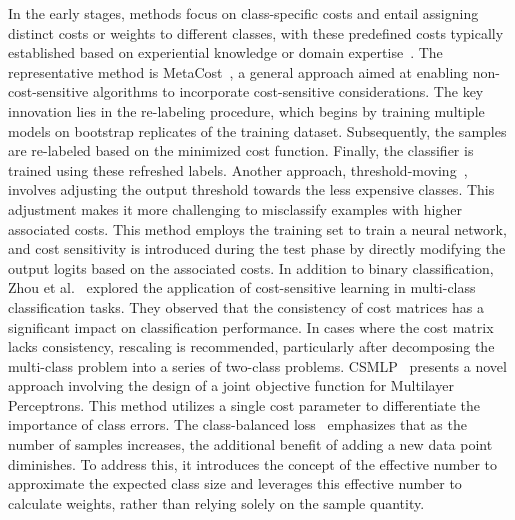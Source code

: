 In the early stages, methods focus on class-specific costs and entail assigning distinct costs or weights to different classes, with these predefined costs typically established based on experiential knowledge or domain expertise~\cite{ref_A, ref_C}. The representative method is MetaCost~\cite{ref_B}, a general approach aimed at enabling non-cost-sensitive algorithms to incorporate cost-sensitive considerations. The key innovation lies in the re-labeling procedure, which begins by training multiple models on bootstrap replicates of the training dataset. Subsequently, the samples are re-labeled based on the minimized cost function. Finally, the classifier is trained using these refreshed labels. Another approach, threshold-moving~\cite{zhou2005training}, involves adjusting the output threshold towards the less expensive classes. This adjustment makes it more challenging to misclassify examples with higher associated costs. This method employs the training set to train a neural network, and cost sensitivity is introduced during the test phase by directly modifying the output logits based on the associated costs. In addition to binary classification, Zhou et al.~\cite{zhou2010multi} explored the application of cost-sensitive learning in multi-class classification tasks. They observed that the consistency of cost matrices has a significant impact on classification performance. In cases where the cost matrix lacks consistency, rescaling is recommended, particularly after decomposing the multi-class problem into a series of two-class problems. CSMLP~\cite{castro2013novel} presents a novel approach involving the design of a joint objective function for Multilayer Perceptrons. This method utilizes a single cost parameter to differentiate the importance of class errors. The class-balanced loss~\cite{cui2019class} emphasizes that as the number of samples increases, the additional benefit of adding a new data point diminishes. To address this, it introduces the concept of the effective number to approximate the expected class size and leverages this effective number to calculate weights, rather than relying solely on the sample quantity.



